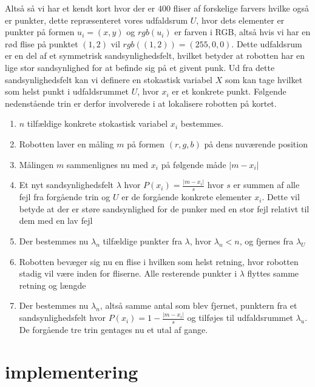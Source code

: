 \documentclass[../../SRP.tex]{subfiles}
\begin{document}

\begin{center}
\end{center}

Altså så vi har et kendt kort hvor der er $400$ fliser af forskelige farvers hvilke også er punkter, dette repræsenteret vores udfaldsrum $U$, hvor dets elementer er punkter på formen $u_i = (x,y)$ og $rgb(u_i)$ er farven i RGB, altså hvis vi har en rød flise på punktet $(1,2)$ vil $rgb((1,2)) = (255,0,0)$. Dette udfaldsrum er en del af et symmetrisk sandsynlighedsfelt, hvilket betyder at robotten har en lige stor sandsynlighed for at befinde sig på et givent punk. Ud fra dette sandsynlighedsfelt kan vi definere en stokastisk variabel $X$ som kan tage hvilket som helst punkt i udfaldsrummet $U$, hvor $x_i$ er et konkrete punkt. Følgende nedenstående trin er derfor involverede i at lokalisere robotten på kortet.

\begin{enumerate}
  \item $n$ tilfældige konkrete stokastisk variabel $x_i$ bestemmes.

  \item Robotten laver en måling $m$ på formen $(r,g,b)$ på dens nuværende position

  \item Målingen $m$ sammenlignes nu med $x_i$ på følgende måde $|m - x_i|$

  \item Et nyt sandsynlighedsfelt $\lambda$ hvor $P(x_i) = \frac{|m - x_i|}{s}$ hvor $s$ er summen af alle fejl fra forgående trin og $U$ er de forgående konkrete elementer $x_i$. Dette vil betyde at der er støre sandsynlighed for de punker med en stor fejl relativt til dem med en lav fejl

  \item Der bestemmes nu $\lambda_n$ tilfældige punkter fra $\lambda$, hvor $ \lambda_n < n$, og fjernes fra $\lambda_U$

  \item Robotten bevæger sig nu en flise i hvilken som helst retning, hvor robotten stadig vil være inden for fliserne. Alle resterende punkter i $\lambda$ flyttes samme retning og længde 

  \item Der bestemmes nu $\lambda_n$, altså samme antal som blev fjernet, punktern fra et sandsynlighedsfelt hvor $P(x_i) = 1-\frac{|m-x_i|}{s}$ og tilføjes til udfaldsrummet $\lambda_u$. De forgående tre trin gentages nu et utal af gange.
\end{enumerate}

\section{implementering}
\end{document}
